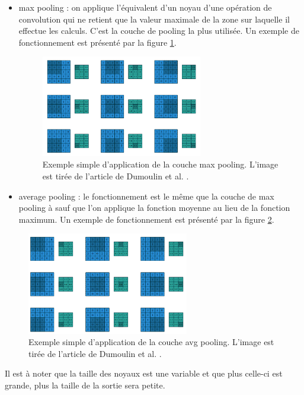 \begin{itemize}
 \item max pooling : on applique l'équivalent d'un noyau d'une opération de convolution qui ne retient que la valeur maximale de la zone sur laquelle il effectue les calculs. C'est la couche de pooling la plus utilisée. Un exemple de fonctionnement est présenté par la figure \ref{max_pooling}.
 
\begin{figure}[!h]
\centering
\includegraphics[width=200pt]{images/cnn/max_pooling.png}
\caption{Exemple simple d'application de la couche max pooling. L'image est tirée de l'article de Dumoulin et al. \cite{dumoulin_guide_2018}.}
\label{max_pooling}
\end{figure}
 
\item average pooling : le fonctionnement est le même que la couche de max pooling à sauf que l'on applique la fonction moyenne au lieu de la fonction maximum. Un exemple de fonctionnement est présenté par la figure \ref{avg_pooling}.
\end{itemize}

\begin{figure}[!h]
\centering
\includegraphics[width=200pt]{images/cnn/avg_pooling.png}
\caption{Exemple simple d'application de la couche avg pooling. L'image est tirée de l'article de Dumoulin et al. \cite{dumoulin_guide_2018}.}
\label{avg_pooling}
\end{figure}


Il est à noter que la taille des noyaux est une variable et que plus celle-ci est grande, plus la taille de la sortie sera petite. 
